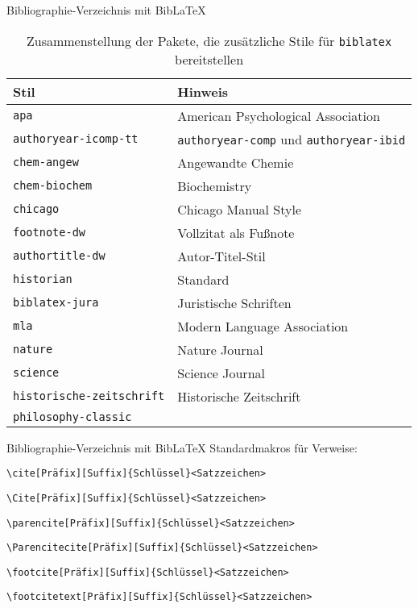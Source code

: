 \begin{frame}[fragile]{Bibliographie-Verzeichnis mit Bib\LaTeX}
\begin{table}
	\caption{Zusammenstellung der Pakete, die zusätzliche Stile für \texttt{biblatex} bereitstellen}
	\begin{tabular}{ll}
		\hline
		Stil & Hinweis \\
		\hline
		\texttt{apa} & American Psychological Association \\
		\texttt{authoryear-icomp-tt} & \texttt{authoryear-comp} und \texttt{authoryear-ibid} \\
		\texttt{chem-angew} & Angewandte Chemie \\
		\texttt{chem-biochem} & Biochemistry \\
		\texttt{chicago} & Chicago Manual Style \\
		\texttt{footnote-dw} & Vollzitat als Fußnote \\
		\texttt{authortitle-dw} & Autor-Titel-Stil \\
		\texttt{historian} & Standard \\
		\texttt{biblatex-jura} & Juristische Schriften \\
		\texttt{mla} & Modern Language Association \\
		\texttt{nature} & Nature Journal \\
		\texttt{science} & Science Journal \\
		\texttt{historische-zeitschrift} & Historische Zeitschrift \\
		\texttt{philosophy-classic} & \\
		\hline
	\end{tabular}
\end{table}

\end{frame}

\begin{frame}[fragile]{Bibliographie-Verzeichnis mit Bib\LaTeX}
Standardmakros für Verweise:
\begin{lstlisting}[sytle=tex]
\cite[Präfix][Suffix]{Schlüssel}<Satzzeichen>
\end{lstlisting}
\begin{lstlisting}[style=tex]
\Cite[Präfix][Suffix]{Schlüssel}<Satzzeichen>
\end{lstlisting}
\begin{lstlisting}[style=tex]
\parencite[Präfix][Suffix]{Schlüssel}<Satzzeichen>
\end{lstlisting}
\begin{lstlisting}[style=tex]
\Parencitecite[Präfix][Suffix]{Schlüssel}<Satzzeichen>
\end{lstlisting}
\begin{lstlisting}[style=tex]
\footcite[Präfix][Suffix]{Schlüssel}<Satzzeichen>
\end{lstlisting}
\begin{lstlisting}[style=tex]
\footcitetext[Präfix][Suffix]{Schlüssel}<Satzzeichen>
\end{lstlisting}
\end{frame}

